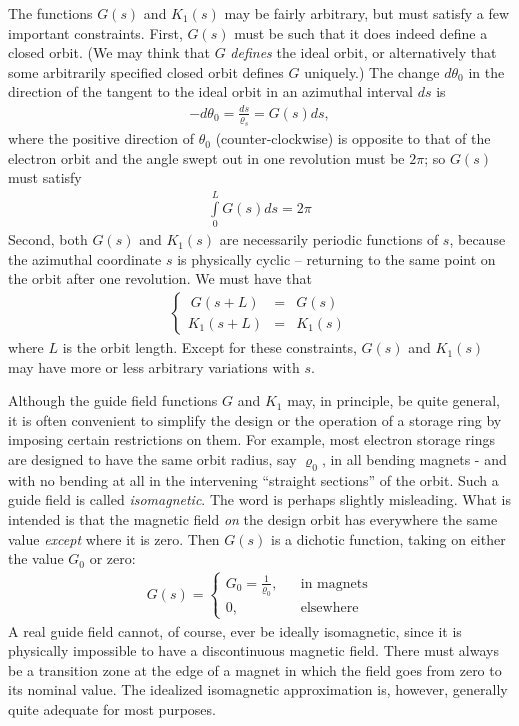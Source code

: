 The functions $G(s)$ and $K_1(s)$ may be fairly arbitrary, but must satisfy a few important constraints. First, $G(s)$ must be such that it does indeed define a closed orbit. (We may think that $G$ \textit{defines} the ideal orbit, or alternatively that some arbitrarily specified closed orbit defines $G$ uniquely.) The change $d\theta_0$ in the direction of the tangent to the ideal orbit in an azimuthal interval $ds$ is
\begin{align}
	-d\theta_0 = \frac{ds}{\varrho_s} = G(s)ds,
\end{align}
where the positive direction of $\theta_0$ (counter-clockwise) is opposite to that of the electron orbit and the angle swept out in one revolution must be $2\pi$; so $G(s)$ must satisfy
\begin{align}
	\int\limits_{0}^{L} G(s)ds = 2\pi
\end{align}
Second, both $G(s)$ and $K_1(s)$ are necessarily periodic functions of $s$, because the azimuthal coordinate $s$ is physically cyclic -- returning to the same point on the orbit after one revolution. We must have that
\begin{align}
	\left\{\begin{array}{rcl}
	\ G(s+L) & = & G(s)\\
	K_1(s+L) & = & K_1(s)
	\end{array}\right.
\end{align}
where $L$ is the orbit length. Except for these constraints, $G(s)$ and $K_1(s)$ may have more or less arbitrary variations with $s$.

Although the guide field functions $G$ and $K_1$ may, in principle, be quite general, it is often convenient to simplify the design or the operation of a storage ring by imposing certain restrictions on them. For example, most electron storage rings are designed to have the same orbit radius, say $\varrho_0$, in all bending magnets - and with no bending at all in the intervening “straight sections” of the orbit. Such a guide field is called \textit{isomagnetic}. The word is perhaps slightly misleading. What is intended is that the magnetic field \textit{on} the design orbit has everywhere the same value \textit{except} where it is zero. Then $G(s)$ is a dichotic function, taking on either the value $G_0$ or zero:
\begin{align}\label{eq:2.9}
	G(s) = \left\{\begin{array}{rrrr}
	G_0 = \frac{1}{\varrho_0}, &&  \text{in magnets}\\
	0, && \text{elsewhere}
	\end{array}\right.
\end{align}
A real guide field cannot, of course, ever be ideally isomagnetic, since it is physically impossible to have a discontinuous magnetic field. There must always be a transition zone at the edge of a magnet in which the field goes from zero to its nominal value. The idealized isomagnetic approximation is, however, generally quite adequate for most purposes.

